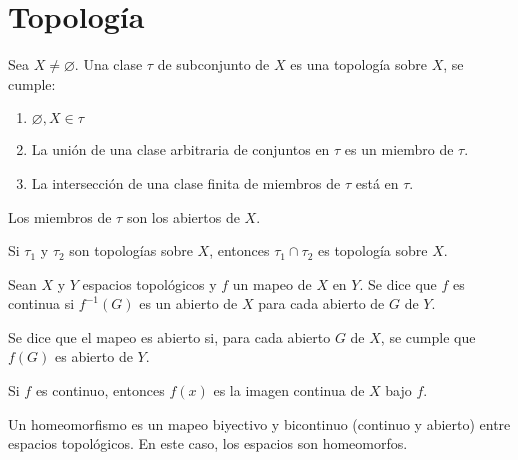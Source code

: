 
\section{Topología}

\begin{definicion}
    Sea $X\neq \varnothing$. Una clase $\tau$ de subconjunto de $X$ es una topología sobre $X$, se cumple: 
    \begin{enumerate}
        \item $\varnothing,X\in \tau$
        \item La unión de una clase arbitraria de conjuntos en $\tau$ es un miembro de $\tau$. 
        \item La intersección de una clase finita de miembros de $\tau$ está en $\tau$. 
    \end{enumerate}
    Los miembros de $\tau$ son los abiertos de $X$. 
\end{definicion}

\begin{prop}
    Si $\tau_1$ y $\tau_2$ son topologías sobre $X$, entonces $\tau_1\cap \tau_2$ es topología sobre $X$.
\end{prop}



\begin{definicion}
    Sean $X$ y $Y$ espacios topológicos y $f$ un mapeo de $X$ en $Y$. Se dice que $f$ es continua si $f^{-1}(G)$ es un abierto de $X$ para cada abierto de $G$ de $Y$. 
\end{definicion}

\begin{definicion}
    Se dice que el mapeo es abierto si, para cada abierto $G$ de $X$, se cumple que $f(G)$ es abierto de $Y$. 
\end{definicion}

\begin{definicion}
    Si $f$ es continuo, entonces $f(x)$ es la imagen continua de $X$ bajo $f$. 
\end{definicion}

\begin{definicion}[Homeomorfismo]
    Un homeomorfismo es un mapeo biyectivo y bicontinuo (continuo y abierto) entre espacios topológicos. En este caso, los espacios son homeomorfos. 
\end{definicion}





